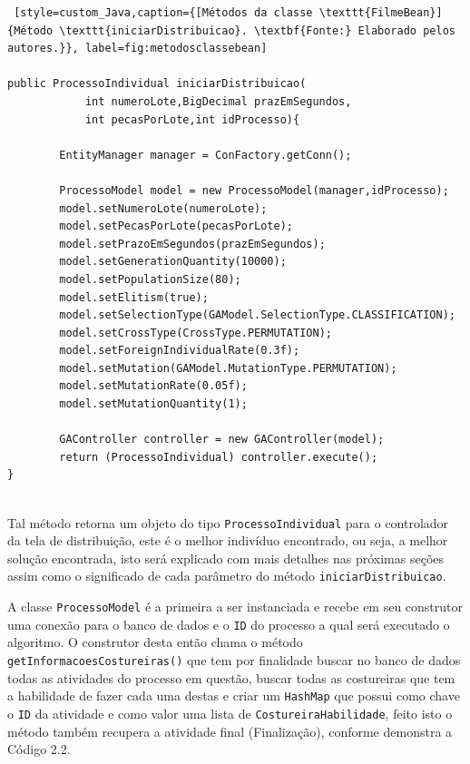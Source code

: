 \begin{lstlisting} [style=custom_Java,caption={[Métodos da classe \texttt{FilmeBean}]{Método \texttt{iniciarDistribuicao}. \textbf{Fonte:} Elaborado pelos autores.}}, label=fig:metodosclassebean] 	

public ProcessoIndividual iniciarDistribuicao(
			int numeroLote,BigDecimal prazEmSegundos,  
			int pecasPorLote,int idProcesso){

		EntityManager manager = ConFactory.getConn(); 
		
		ProcessoModel model = new ProcessoModel(manager,idProcesso);
		model.setNumeroLote(numeroLote);
		model.setPecasPorLote(pecasPorLote);
		model.setPrazoEmSegundos(prazEmSegundos);
		model.setGenerationQuantity(10000);
		model.setPopulationSize(80);
		model.setElitism(true);
		model.setSelectionType(GAModel.SelectionType.CLASSIFICATION);
		model.setCrossType(CrossType.PERMUTATION);
		model.setForeignIndividualRate(0.3f);
		model.setMutation(GAModel.MutationType.PERMUTATION);
		model.setMutationRate(0.05f);
		model.setMutationQuantity(1);

		GAController controller = new GAController(model);
		return (ProcessoIndividual) controller.execute();
}


\end{lstlisting}

\par Tal método retorna um objeto do tipo \texttt{ProcessoIndividual} para o controlador da tela de distribuição, este é o melhor indivíduo encontrado, ou seja, a melhor solução encontrada, isto será explicado com mais detalhes nas próximas seções assim como o significado de cada 
parâmetro do método \texttt{iniciarDistribuicao}. 

\par A classe \texttt{ProcessoModel} é a primeira a ser instanciada  e  recebe em seu construtor uma conexão para o 
banco de dados e o \texttt{ID} do processo a qual será executado o algoritmo. O construtor desta então chama o método
\texttt{getInformacoesCostureiras()} que tem por finalidade buscar no banco de dados todas as atividades do processo em questão, 
buscar todas as costureiras que tem a habilidade de fazer cada uma destas e criar um \texttt{HashMap} que possui como chave o 
\texttt{ID} da atividade e como valor uma lista de \texttt{CostureiraHabilidade}, feito isto o método também recupera  a 
atividade final (Finalização), conforme demonstra a Código 2.2.



